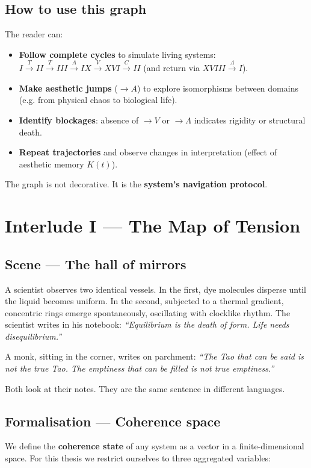 \documentclass[12pt,oneside]{report}
\begin{document}
\section{How to use this graph}
The reader can:
\begin{itemize}
\item \textbf{Follow complete cycles} to simulate living systems:  
  \(I \xrightarrow{T} II \xrightarrow{T} III \xrightarrow{A} IX \xrightarrow{V} XVI \xrightarrow{C} II\) (and return via \(XVIII \xrightarrow{\Lambda} I\)).
\item \textbf{Make aesthetic jumps} (\(\to A\)) to explore isomorphisms between domains (e.g. from physical chaos to biological life).
\item \textbf{Identify blockages}: absence of \(\to V\) or \(\to \Lambda\) indicates rigidity or structural death.
\item \textbf{Repeat trajectories} and observe changes in interpretation (effect of aesthetic memory \(K(t)\)).
\end{itemize}
The graph is not decorative. It is the \textbf{system’s navigation protocol}.

\chapter{Interlude I — The Map of Tension}

\section{Scene — The hall of mirrors}
A scientist observes two identical vessels. In the first, dye molecules disperse until the liquid becomes uniform. In the second, subjected to a thermal gradient, concentric rings emerge spontaneously, oscillating with clocklike rhythm. The scientist writes in his notebook: \textit{“Equilibrium is the death of form. Life needs disequilibrium.”}

A monk, sitting in the corner, writes on parchment: \textit{“The Tao that can be said is not the true Tao. The emptiness that can be filled is not true emptiness.”}

Both look at their notes. They are the same sentence in different languages.

\section{Formalisation — Coherence space}
We define the \textbf{coherence state} of any system as a vector in a finite-dimensional space. For this thesis we restrict ourselves to three aggregated variables:
\end{document}
